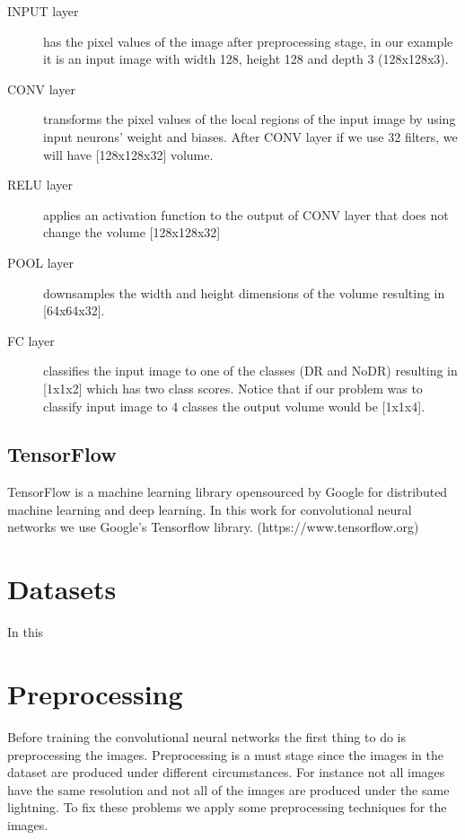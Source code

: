 \begin{description}
    \item[INPUT layer] has the pixel values of the image after preprocessing stage, in our example it is an input image with width 128, height 128 and depth 3 (128x128x3).
    \item[CONV layer] transforms the pixel values of the local regions of the input image by using input neurons' weight and biases. After CONV layer if we use 32 filters, we will have [128x128x32] volume.
    \item[RELU layer] applies an activation function to the output of CONV layer that does not change the volume [128x128x32]
    \item[POOL layer] downsamples the width and height dimensions of the volume resulting in [64x64x32].
    \item[FC layer] classifies the input image to one of the classes (DR and NoDR) resulting in [1x1x2] which has two class scores. Notice that if our problem was to classify input image to 4 classes the output volume would be [1x1x4].
\end{description}


\subsection{TensorFlow}
TensorFlow is a machine learning library opensourced by Google for distributed machine learning and deep learning. In this work for convolutional neural networks we use Google's Tensorflow library. (https://www.tensorflow.org) 

\section{Datasets}

In this 

\section{Preprocessing}
Before training the convolutional neural networks the first thing to do is preprocessing the images. Preprocessing is a must stage since the images in the dataset are produced under different circumstances. For instance not all images have the same resolution and not all of the images are produced under the same lightning. To fix these problems we apply some preprocessing techniques for the images. 

